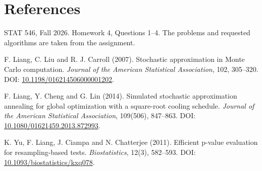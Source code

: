 \documentclass[11pt]{article}
\begin{document}
\section*{References}

STAT 546, Fall 2026. Homework 4, Questions 1--4. The problems and requested algorithms are taken from the
assignment.

F. Liang, C. Liu and R. J. Carroll (2007). Stochastic approximation in Monte Carlo computation. \emph{Journal of
the American Statistical Association}, 102, 305--320. DOI:
\href{https://doi.org/10.1198/016214506000001202}{10.1198/016214506000001202}.

F. Liang, Y. Cheng and G. Lin (2014). Simulated stochastic approximation annealing for global optimization with
a square-root cooling schedule. \emph{Journal of the American Statistical Association}, 109(506), 847--863.
DOI: \href{https://doi.org/10.1080/01621459.2013.872993}{10.1080/01621459.2013.872993}.

K. Yu, F. Liang, J. Ciampa and N. Chatterjee (2011). Efficient p-value evaluation for resampling-based tests.
\emph{Biostatistics}, 12(3), 582--593. DOI:
\href{https://doi.org/10.1093/biostatistics/kxq078}{10.1093/biostatistics/kxq078}.
\end{document}
